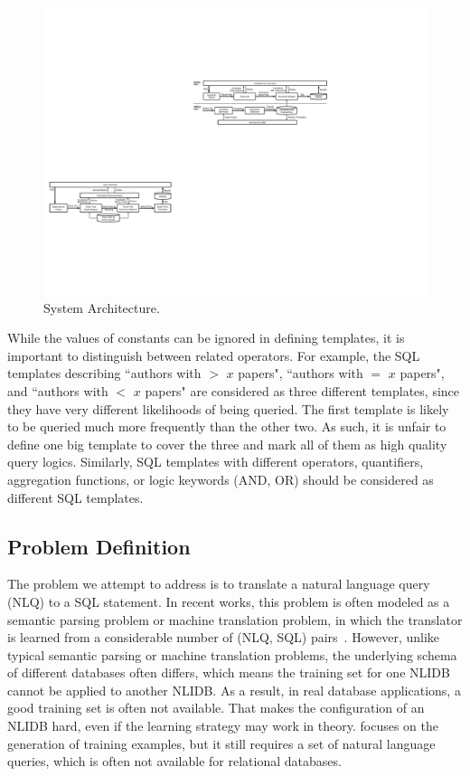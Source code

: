 \documentclass{vldb}
\begin{document}
\begin{figure}
  \center
  \includegraphics[width=0.9\linewidth]{pic/systemArchitecture.pdf}
  \caption{System Architecture.}
  \label{fig:systemArchitecture}
\end{figure}

While the values of constants can be ignored in defining templates, it is important to distinguish between related operators.  For example, the SQL templates describing ``authors with $>$ $x$ papers", ``authors with $=$ $x$ papers", and ``authors with $<$ $x$ papers" are considered as three different templates, since they have very different likelihoods of being queried.  The first template is likely to be queried much more frequently than the other two.  As such, it is unfair to define one big template to cover the three and mark all of them as high quality query logics.  Similarly, SQL templates with different operators, quantifiers, aggregation functions, or logic keywords (AND, OR)  should be considered as different SQL templates.  

\subsection{Problem Definition}
The problem we attempt to address is to translate a natural language query (NLQ) to a SQL statement.  In recent works, this problem is often modeled as a semantic parsing problem or machine translation problem, in which the translator is learned from a considerable number of (NLQ, SQL) pairs~\cite{DBLP:conf/acl/DongL16,DBLP:journals/debu/LuLK16,DBLP:journals/cacm/Liang16,DBLP:journals/tacl/ReddyTCKDSL16}.  However, unlike typical semantic parsing or machine translation problems, the underlying schema of different databases often differs, which means the training set for one NLIDB cannot be applied to another NLIDB.  As a result, in real database applications, a good training set is often not available.  That makes the configuration of an NLIDB hard, even if the learning strategy may work in theory.  \cite{DBLP:conf/sigmod/ZhengZLYSZ15} focuses on the generation of training examples, but it still requires a set of natural language queries, which is often not available for relational databases.  
\end{document}
